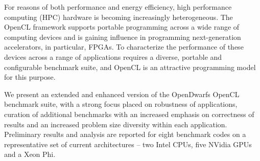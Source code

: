 \documentclass[../document.tex]{subfiles}
\begin{document}
For reasons of both performance and energy efficiency, high performance computing (HPC) hardware is becoming increasingly heterogeneous.
The OpenCL framework supports portable programming across a wide range of computing devices and is gaining influence in programming next-generation accelerators, in particular, FPGAs.
To characterize the performance of these devices across a range of applications requires a diverse, portable and configurable benchmark suite, and OpenCL is an attractive programming model for this purpose.


We present an extended and enhanced version of the OpenDwarfs OpenCL benchmark suite, with a strong focus placed on robustness of applications, curation of additional benchmarks with an increased emphasis on correctness of results and an increased problem size diversity within each application.
Preliminary results and analysis are reported for eight benchmark codes on a representative set of current architectures -- two Intel CPUs, five NVidia GPUs and a Xeon Phi.



\end{document}
